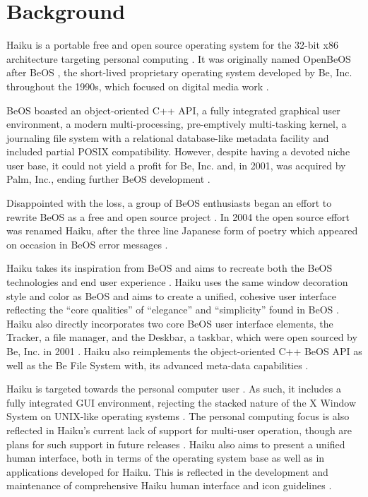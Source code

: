 \documentclass{article}
\begin{document}
\maketitle

\section{Background}

Haiku is a portable \cite{HaikuFaq} free and open source
\cite{HaikuDevFaq} operating system for the 32-bit x86 architecture
\cite{HaikuFaq} targeting personal computing \cite{HaikuAbout}.  It
was originally named OpenBeOS after BeOS \cite{HaikuWiki}, the
short-lived proprietary operating system developed by Be,
Inc. throughout the 1990s, which focused on digital media work
\cite{BeosWiki}.

BeOS boasted an object-oriented C++ API, a fully integrated graphical
user environment, a modern multi-processing, pre-emptively
multi-tasking kernel, a journaling file system with a relational
database-like metadata facility \cite{BFSWiki} and included partial
POSIX compatibility.  However, despite having a devoted niche user
base, it could not yield a profit for Be, Inc. and, in 2001, was
acquired by Palm, Inc., ending further BeOS
development \cite{BeosWiki}.

Disappointed with the loss, a group of BeOS enthusiasts began an
effort to rewrite BeOS as a free and open source project
\cite{BeosWiki, HaikuHistoryWiki}.  In 2004 the open source effort was
renamed Haiku, after the three line Japanese form of poetry which
appeared on occasion in BeOS error messages \cite{HaikuFaq,
HaikuHistoryWiki}.

Haiku takes its inspiration from BeOS \cite{HaikuAbout} and aims to
recreate both the BeOS technologies and end user experience
\cite{HaikuFaq}.  Haiku uses the same window decoration style and
color as BeOS \cite{HaikuWiki, BeosWiki} and aims to create a
unified, cohesive user interface \cite{HaikuAbout, HaikuHIG,
HaikuIcon} reflecting the ``core qualities'' of ``elegance'' and
``simplicity'' found in BeOS \cite{HaikuFaq}.  Haiku also directly
incorporates two core BeOS user interface elements, the Tracker, a
file manager, and the Deskbar, a taskbar, which were open sourced by
Be, Inc. in 2001 \cite{HaikuFaq}.  Haiku also reimplements the
object-oriented C++ BeOS API\cite{HaikuWiki} as well as the Be File
System with, its advanced meta-data capabilities \cite{BFSWiki}.

Haiku is targeted towards the personal computer user
\cite{HaikuAbout}.  As such, it includes a fully integrated GUI
environment, rejecting the stacked nature of the X Window System on
UNIX-like operating systems \cite{HaikuFaq}.  The personal computing
focus is also reflected in Haiku's current lack of support for
multi-user operation, though are plans for such support in future
releases \cite{HaikuFuture}.  Haiku also aims to present a unified
human interface, both in terms of the operating system base as well as
in applications developed for Haiku.  This is reflected in the
development and maintenance of comprehensive Haiku human interface and
icon guidelines \cite{HaikuHIG, HaikuIcon}.
\end{document}
